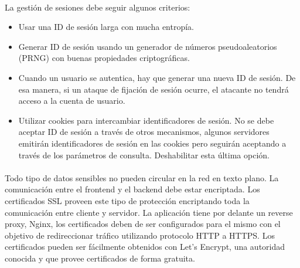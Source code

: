 \paragraph{}
La gestión de sesiones debe seguir algunos criterios:
\begin{itemize}
\item{Usar una ID de sesión larga con mucha entropía.}
\item{Generar ID de sesión usando un generador de números
  pseudoaleatorios (PRNG) con buenas propiedades criptográficas.}
\item{Cuando un usuario se autentica, hay que generar una nueva ID de
  sesión. De esa manera, si un ataque de fijación de sesión ocurre, el
  atacante no tendrá acceso a la cuenta de usuario.}
\item{Utilizar cookies para intercambiar identificadores de sesión. No
  se debe aceptar ID de sesión a través de otros mecanismos, algunos
  servidores emitirán identificadores de sesión en las cookies pero
  seguirán aceptando a través de los parámetros de
  consulta. Deshabilitar esta última opción.}
\end{itemize}
\paragraph{}
Todo tipo de datos sensibles no pueden circular en la red en texto
plano. La comunicación entre el frontend y el backend debe estar
encriptada. Los certificados SSL proveen este tipo de protección
encriptando toda la comunicación entre cliente y servidor. La
aplicación tiene por delante un reverse proxy, Nginx, los certificados
deben de ser configurados para el mismo con el objetivo de
redireccionar tráfico utilizando protocolo HTTP a HTTPS. Los
certificados pueden ser fácilmente obtenidos con Let’s Encrypt, una
autoridad conocida y que provee certificados de forma gratuita.
